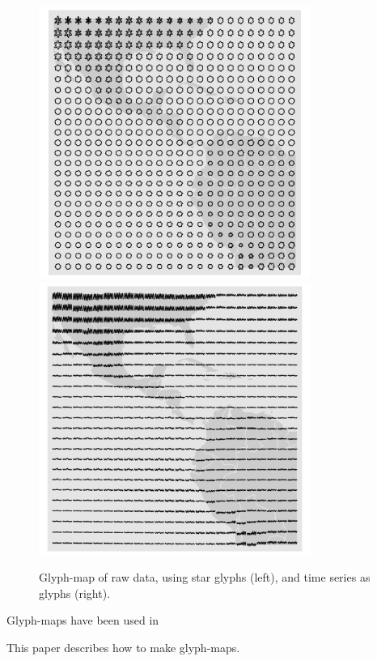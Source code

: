 \documentclass[oneside]{article}
\begin{document}
\begin{figure}[htp]
\centerline{\includegraphics[width=3.5in]{nasa-glyph-all.pdf}\includegraphics[width=3.5in]{nasa-glyph-ts-all.pdf}}
\caption{Glyph-map of raw data, using star glyphs (left), and time series as glyphs (right).}
\label{fig:glyph-map}
\end{figure}

Glyph-maps have been used in 

This paper describes how to make glyph-maps. 


\end{document}
